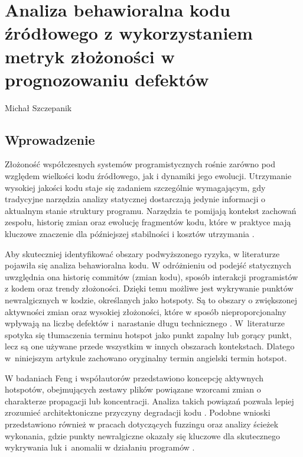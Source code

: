 \chapter[Analiza behawioralna \ldots]{Analiza behawioralna kodu źródłowego z wykorzystaniem metryk złożoności w prognozowaniu defektów}
\thispagestyle{empty}
\vspace{-8mm} {\large Michał Szczepanik} \vspace{8mm}

\section{Wprowadzenie}
Złożoność współczesnych systemów programistycznych rośnie zarówno pod względem wielkości kodu źródłowego, jak i dynamiki jego ewolucji. Utrzymanie wysokiej jakości kodu staje się zadaniem szczególnie wymagającym, gdy tradycyjne narzędzia analizy statycznej dostarczają jedynie informacji o aktualnym stanie struktury programu. Narzędzia te pomijają kontekst zachowań zespołu, historię zmian oraz ewolucję fragmentów kodu, które w praktyce mają kluczowe znaczenie dla późniejszej stabilności i kosztów utrzymania \cite{Ernst2021,Li2015,Martini2018}. 

Aby skuteczniej identyfikować obszary podwyższonego ryzyka, w literaturze pojawiła się analiza behawioralna kodu. W odróżnieniu od podejść statycznych uwzględnia ona historię commitów (zmian kodu), sposób interakcji programistów z kodem oraz trendy złożoności. Dzięki temu możliwe jest wykrywanie punktów newralgicznych w kodzie, określanych jako hotspoty. Są to obszary o zwiększonej aktywności zmian oraz wysokiej złożoności, które w sposób nieproporcjonalny wpływają na liczbę defektów i~narastanie długu technicznego \cite{Borg2023,Tornhill2018,Tornhill2024,Tornhill2022}. W~literaturze spotyka się tłumaczenia terminu hotspot jako punkt zapalny lub gorący punkt, lecz są one używane przede wszystkim w innych obszarach kontekstach. Dlatego w~niniejszym artykule zachowano oryginalny termin angielski termin hotspot.

W badaniach Feng i współautorów przedstawiono koncepcję aktywnych hotspotów, obejmujących zestawy plików powiązane wzorcami zmian o charakterze propagacji lub koncentracji. Analiza takich powiązań pozwala lepiej zrozumieć architektoniczne przyczyny degradacji kodu \cite{Feng2019}. Podobne wnioski przedstawiono również w pracach dotyczących fuzzingu oraz analizy ścieżek wykonania, gdzie punkty newralgiczne okazały się kluczowe dla skutecznego wykrywania luk i~anomalii w działaniu programów \cite{Du2024,Pang2021,Saha2023}. 

